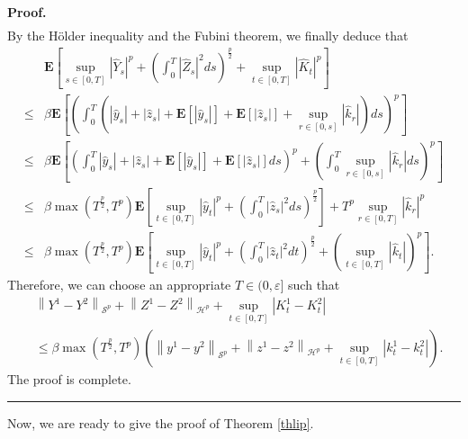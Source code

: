 \documentclass[10pt]{article}%
\numberwithin{equation}{section}
\newenvironment{proof}[1][Proof]{\noindent \textbf{#1.} }{\  \rule{0.5em}{0.5em}}
\def \E{\mathbf{E}}
\begin{document}
\begin{proof}
\begin{align*}
\end{align*}
By the H\"{o}lder inequality and the Fubini theorem, we finally deduce that 
\begin{align*}
&\E\left[\sup_{s\in[0,T]}|\hat{Y}_s|^p+\left(\int_0^T |\hat{Z}_s|^2 d s\right)^{\frac{p}{2}}+\sup_{t\in[0,T]}|\hat{K}_t|^p\right]\\
\leq &\beta\E\left[\left(\int_0^T \left(|\hat{y}_s|+|\hat{z}_s|+\E[|\hat{y}_s|]+\E[|\hat{z}_s|]+\sup_{r\in[0,s]}|\hat{k}_r|\right)ds\right)^p\right]\\
\leq &\beta\E\left[\left(\int_0^T |\hat{y}_s|+|\hat{z}_s|+\E[|\hat{y}_s|]+\E[|\hat{z}_s|]ds\right)^p+\left(\int_0^T\sup_{r\in[0,s]}|\hat{k}_r|ds\right)^p\right]\\
\leq &\beta\max\left(T^{\frac{p}{2}},T^p\right)\E\left[\sup_{t\in[0,T]}|\hat{y}_t|^p+\left(\int_0^T|\hat{z}_s|^2 ds\right)^{\frac{p}{2}}\right]+ T^p \sup_{r\in[0,T]}|\hat{k}_r|^p\\
\leq &\beta\max\left(T^{\frac{p}{2}},T^p\right)\E\left[\sup_{t\in[0,T]}|\hat{y}_t|^p+\left(\int_0^T|\hat{z}_t|^2 dt\right)^{\frac{p}{2}}+\left(\sup_{t\in[0,T]}|\hat{k}_t|\right)^p\right].
\end{align*}
Therefore, we can choose an appropriate  $T \in(0,\varepsilon]$ such that
$$
\begin{aligned}
  &\left\|Y^{1}-Y^{2}\right\|_{\mathcal{S}^{p}}+\left\|Z^{1}-Z^{2}\right\|_{\mathcal{H}^{p}}+\sup_{t\in[0,T]}\left|K_{t}^{1}-K_{t}^{2}\right|\\
  &\leq \beta\max\left(T^{\frac{p}{2}},T^p\right) \left(\left\|y^1-y^2\right\|_{\mathcal{S}^{p}}+\left\|z^1-z^2\right\|_{\mathcal{H}^{p}}+\sup_{t\in[0,T]}\left|k_t^1-k_t^2\right|\right). %
\end{aligned}
$$
The proof is complete.
\end{proof}



Now,  we are ready to give the proof of Theorem \ref{thlip}. 
\end{document}
